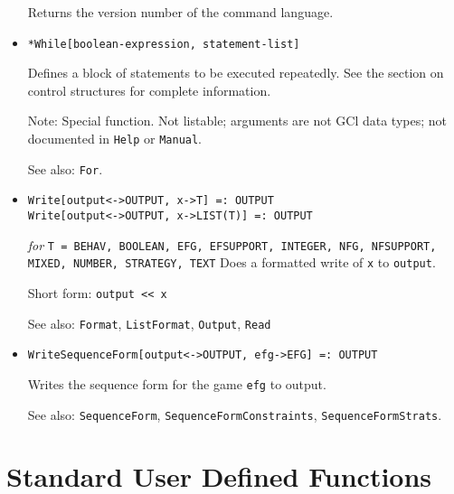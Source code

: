\begin{itemize}
\bd
Returns the version number of the command language.
\ed



\item{} 
\protect \large \begin{verbatim}
*While[boolean-expression, statement-list]
\end{verbatim} \normalsize
  
\bd
Defines a block of statements to be executed repeatedly.
See the section on control structures for complete information.
\item [Note:] Special function.  Not listable; arguments are not GCl
data types; not documented in \verb+Help+ or \verb+Manual+.  
\item
[See also:] \verb+For+.
\ed

\item{}
\protect \large \begin{verbatim}
Write[output<->OUTPUT, x->T] =: OUTPUT  
Write[output<->OUTPUT, x->LIST(T)] =: OUTPUT
\end{verbatim}\normalsize

{\it for} {\tt T = BEHAV, BOOLEAN, EFG, EFSUPPORT, INTEGER,
NFG, NFSUPPORT, MIXED, NUMBER, STRATEGY, TEXT}
\bd
Does a formatted write of \verb+x+ to \verb+output+.
\item [Short form:] \verb+output << x+
\item [See also:] \verb+Format+, \verb+ListFormat+, \verb+Output+, \verb+Read+
\ed

\item{}
\protect \large \begin{verbatim} 
WriteSequenceForm[output<->OUTPUT, efg->EFG] =: OUTPUT
\end{verbatim}\normalsize

\bd 
Writes the sequence form for the game \verb+efg+ to output.  
\item [See also:] \verb+SequenceForm+,
\verb+SequenceFormConstraints+, \verb+SequenceFormStrats+.
\ed




\end{itemize}

\section{Standard User Defined Functions}
\renewcommand{\mysectionname}{\thesection\,\, USER DEFINED FUNCTIONS}


